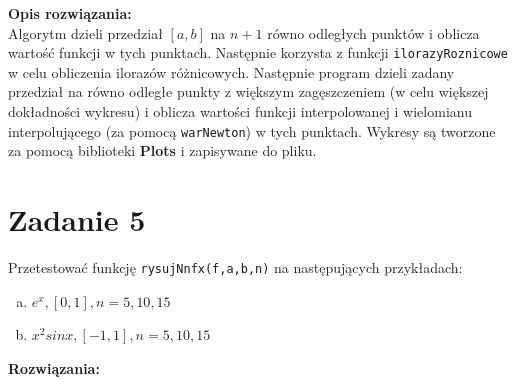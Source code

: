 \documentclass[12pt]{article}
\begin{document}
\noindent \textbf{Opis rozwiązania:}\\
Algorytm dzieli przedział $[a,b]$ na $n+1$ równo odległych punktów i oblicza wartość funkcji w tych punktach. Następnie korzysta z funkcji \texttt{ilorazyRoznicowe} w celu obliczenia ilorazów różnicowych. Następnie program dzieli zadany przedział na równo odległe punkty z większym zagęszczeniem (w celu większej dokładności wykresu) i oblicza wartości funkcji interpolowanej i wielomianu interpolującego (za pomocą \texttt{warNewton}) w tych punktach. Wykresy są tworzone za pomocą biblioteki \textbf{Plots} i zapisywane do pliku.

\section{Zadanie 5}
Przetestować funkcję \texttt{rysujNnfx(f,a,b,n)} na następujących przykładach:
\begin{enumerate}[(a)]
	\item $e^x, [0,1], n=5,10,15$
	\item $x^2sin x, [-1, 1], n=5,10,15$
\end{enumerate}


\noindent \textbf{Rozwiązania:}
\clearpage
\end{document}
